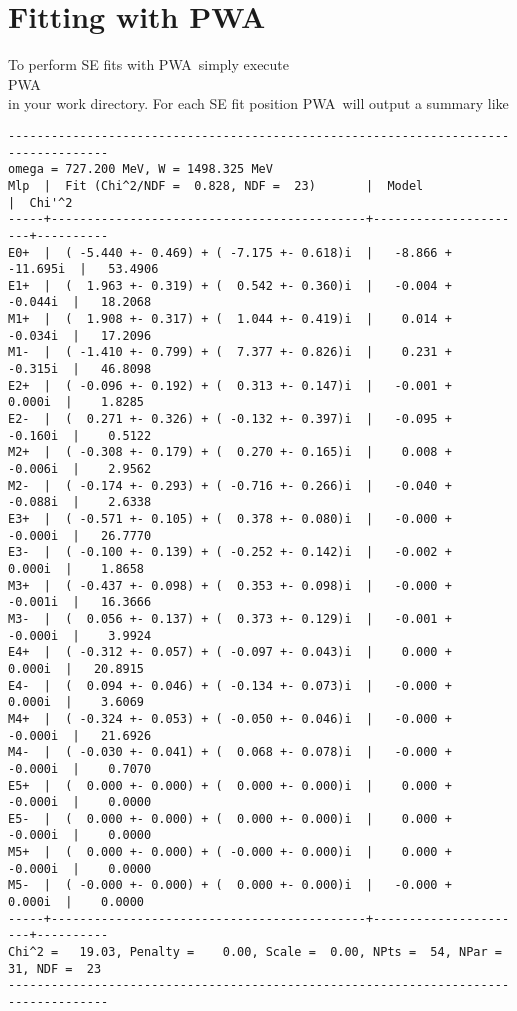 \documentclass[a4paper,10pt]{article}
\def\PWA{\ttfamily PWA\rmfamily\ }
\def\tt{\ttfamily}
\def\rm{\rmfamily}
\begin{document}
\section{Fitting with \PWA}

To perform SE fits with \PWA simply execute\\
\PWA \tt [\textit{PWA.cfg}] \rm \\
in your work directory. For each SE fit position \PWA will output a summary like
\begin{verbatim}
------------------------------------------------------------------------------------
omega = 727.200 MeV, W = 1498.325 MeV
Mlp  |  Fit (Chi^2/NDF =  0.828, NDF =  23)       |  Model               |  Chi'^2
-----+--------------------------------------------+----------------------+----------
E0+  |  ( -5.440 +- 0.469) + ( -7.175 +- 0.618)i  |   -8.866 + -11.695i  |   53.4906
E1+  |  (  1.963 +- 0.319) + (  0.542 +- 0.360)i  |   -0.004 +  -0.044i  |   18.2068
M1+  |  (  1.908 +- 0.317) + (  1.044 +- 0.419)i  |    0.014 +  -0.034i  |   17.2096
M1-  |  ( -1.410 +- 0.799) + (  7.377 +- 0.826)i  |    0.231 +  -0.315i  |   46.8098
E2+  |  ( -0.096 +- 0.192) + (  0.313 +- 0.147)i  |   -0.001 +   0.000i  |    1.8285
E2-  |  (  0.271 +- 0.326) + ( -0.132 +- 0.397)i  |   -0.095 +  -0.160i  |    0.5122
M2+  |  ( -0.308 +- 0.179) + (  0.270 +- 0.165)i  |    0.008 +  -0.006i  |    2.9562
M2-  |  ( -0.174 +- 0.293) + ( -0.716 +- 0.266)i  |   -0.040 +  -0.088i  |    2.6338
E3+  |  ( -0.571 +- 0.105) + (  0.378 +- 0.080)i  |   -0.000 +  -0.000i  |   26.7770
E3-  |  ( -0.100 +- 0.139) + ( -0.252 +- 0.142)i  |   -0.002 +   0.000i  |    1.8658
M3+  |  ( -0.437 +- 0.098) + (  0.353 +- 0.098)i  |   -0.000 +  -0.001i  |   16.3666
M3-  |  (  0.056 +- 0.137) + (  0.373 +- 0.129)i  |   -0.001 +  -0.000i  |    3.9924
E4+  |  ( -0.312 +- 0.057) + ( -0.097 +- 0.043)i  |    0.000 +   0.000i  |   20.8915
E4-  |  (  0.094 +- 0.046) + ( -0.134 +- 0.073)i  |   -0.000 +   0.000i  |    3.6069
M4+  |  ( -0.324 +- 0.053) + ( -0.050 +- 0.046)i  |   -0.000 +  -0.000i  |   21.6926
M4-  |  ( -0.030 +- 0.041) + (  0.068 +- 0.078)i  |   -0.000 +  -0.000i  |    0.7070
E5+  |  (  0.000 +- 0.000) + (  0.000 +- 0.000)i  |    0.000 +  -0.000i  |    0.0000
E5-  |  (  0.000 +- 0.000) + (  0.000 +- 0.000)i  |    0.000 +  -0.000i  |    0.0000
M5+  |  (  0.000 +- 0.000) + ( -0.000 +- 0.000)i  |    0.000 +  -0.000i  |    0.0000
M5-  |  ( -0.000 +- 0.000) + (  0.000 +- 0.000)i  |   -0.000 +   0.000i  |    0.0000
-----+--------------------------------------------+----------------------+----------
Chi^2 =   19.03, Penalty =    0.00, Scale =  0.00, NPts =  54, NPar = 31, NDF =  23
------------------------------------------------------------------------------------
\end{verbatim}
\end{document}
